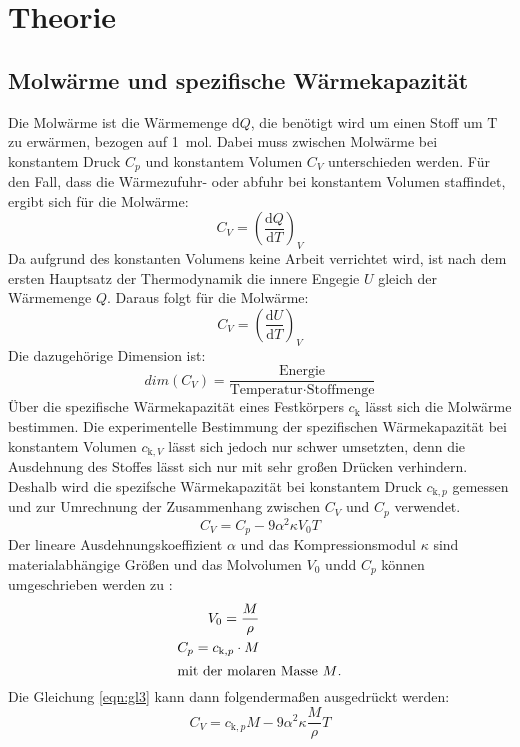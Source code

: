 \section{Theorie}
\label{sec:Theorie}

\subsection{Molwärme und spezifische Wärmekapazität}
\label{sec:molwärme}

Die Molwärme ist die Wärmemenge $\text{d}Q$, die benötigt wird um einen Stoff um $\text{T}$ zu erwärmen, bezogen auf \SI{1}{\mol}.
Dabei muss zwischen Molwärme bei konstantem Druck $C_p$ und konstantem Volumen $C_V$ unterschieden werden.
Für den Fall, dass die Wärmezufuhr- oder abfuhr bei konstantem Volumen staffindet, ergibt sich für die Molwärme:
\begin{equation}
  C_V = \left(\frac{\text{d}Q}{\text{d}T}\right)_V
  \label{eqn:gl1}
\end{equation}
Da aufgrund des konstanten Volumens keine Arbeit verrichtet wird, ist nach dem ersten Hauptsatz der Thermodynamik die innere Engegie $U$ gleich der Wärmemenge $Q$.
Daraus folgt für die Molwärme:
\begin{equation}
  C_V = \left(\frac{\text{d}U}{\text{d}T}\right)_V
  \label{eqn:gl2}
\end{equation}
Die dazugehörige Dimension ist:
\begin{equation*}
  dim (C_V) = \frac{\text{Energie}}{\text{Temperatur} \cdot \text{Stoffmenge}}
\end{equation*}
Über die spezifische Wärmekapazität eines Festkörpers $c_\text{k}$ lässt sich die Molwärme bestimmen.
Die experimentelle Bestimmung der spezifischen Wärmekapazität  bei konstantem Volumen $c_{\text{k},V}$ lässt sich jedoch nur schwer umsetzten, denn die Ausdehnung des Stoffes lässt sich nur mit sehr großen Drücken verhindern.
Deshalb wird die spezifsche Wärmekapazität bei konstantem Druck $c_{\text{k},p}$ gemessen und zur Umrechnung der Zusammenhang zwischen $C_V$ und $C_p$ verwendet.
\begin{equation}
  C_V = C_p - 9 \alpha^2 \kappa V_0 T
  \label{eqn:gl3}
\end{equation}
Der lineare Ausdehnungskoeffizient $\alpha$ und das Kompressionsmodul $\kappa$ sind materialabhängige Größen und das Molvolumen $V_0$ undd $C_p$ können umgeschrieben werden zu \cite{Molwärme}:
\begin{align*}
  V_0 = \frac{M}{\rho} \\
  C_p = c_{\text{k},p} \cdot M \\
  \intertext{mit der molaren Masse $M$.}
\end{align*}
Die Gleichung \eqref{eqn:gl3} kann dann folgendermaßen ausgedrückt werden:
\begin{equation}
  C_V = c_{\text{k},p} M - 9 \alpha^2 \kappa \frac{M}{\rho} T
  \label{eqn:gl4}
\end{equation}

